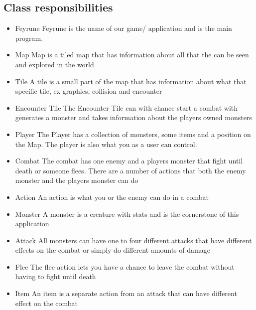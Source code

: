 \subsection{Class responsibilities}

\begin{itemize}
    \item Feyrune
    \subitem Feyrune is the name of our game/ application and is the main program.
    \item Map
    \subitem Map is a tiled map that has information about all that the can be seen and explored in the world
    \item Tile
    \subitem A tile is a small part of the map that has information about what that specific tile, ex graphics, collision and encounter
    \item Encounter Tile
    \subitem The Encounter Tile can with chance start a combat with generates a monster and takes information about the players owned monsters
    \item Player
    \subitem The Player has a collection of monsters, some items and a position on the Map. The player is also what you as a user can control.
    \item Combat
    \subitem The combat has one enemy and a players monster that fight until death or someone flees. There are a number of actions that both the enemy monster and the players monster can do
    \item Action
    \subitem An action is what you or the enemy can do in a combat
    \item Monster
    \subitem A monster is a creature with stats and is the cornerstone of this application
    \item Attack
    \subitem All monsters can have one to four different attacks that have different effects on the combat or simply do different amounts of damage
    \item Flee
    \subitem The flee action lets you have a chance to leave the combat without having to fight until death
    \item Item
    \subitem An item is a separate action from an attack that can have different effect on the combat
\end{itemize}